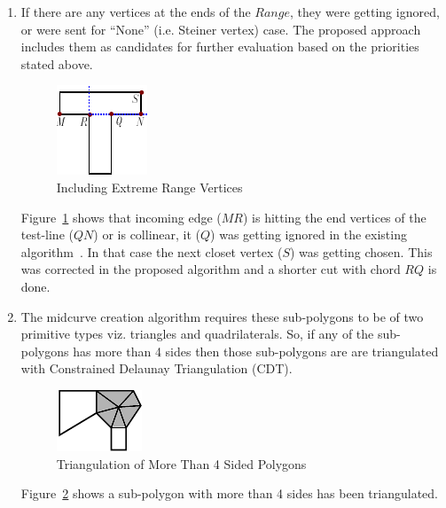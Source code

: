 \begin{enumerate}
[noitemsep,topsep=2pt,parsep=2pt,partopsep=2pt,leftmargin=*]

\item If there are any vertices at the ends of the $Range$, they were getting ignored, or were sent for ``None'' (i.e. Steiner vertex) case. The proposed approach includes them as candidates for further evaluation based on the priorities stated above.


\begin{figure}[h]
\centering \includegraphics[width=0.25\linewidth]{images/polydecomp_mine_1.pdf} 
\caption{Including Extreme Range Vertices}
\label{fig_mine}
\end{figure}



Figure~\ref{fig_mine} shows that incoming edge ($MR$) is hitting the end vertices of the test-line ($QN$) or is collinear, it ($Q$) was getting ignored in the existing algorithm~\cite{Bayazit}. In that case the next closet vertex ($S$) was getting chosen. This was corrected in the proposed algorithm and a shorter cut with chord $RQ$ is done.

\item The midcurve creation algorithm requires these sub-polygons to be of two primitive types viz. triangles and quadrilaterals. So, if any of the sub-polygons has more than 4 sides then those sub-polygons are are triangulated with Constrained Delaunay Triangulation (CDT).


\begin{figure}[h]
\centering \includegraphics[width=0.3\linewidth]{images/polydecomp_divide_all_2.pdf} 
\caption{Triangulation of More Than 4 Sided Polygons}
\label{fig_divideall}
\end{figure}


Figure~\ref{fig_divideall} shows a sub-polygon with more than 4 sides has been triangulated.

\end{enumerate}


